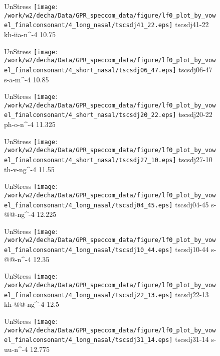 \documentclass{article}
\begin{document}
\begin{figure}[t]
\begin{minipage}[b]{.24\textwidth}
UnStress
\centering
\texttt{[image: /work/w2/decha/Data/GPR\_speccom\_data/figure/lf0\_plot\_by\_vowel\_finalconsonant/4\_long\_nasal/tscsdj41\_22.eps]}
tscsdj41-22 kh-iia-n\textasciicircum-4 10.75
\end{minipage}
\begin{minipage}[b]{.24\textwidth}
UnStress
\centering
\texttt{[image: /work/w2/decha/Data/GPR\_speccom\_data/figure/lf0\_plot\_by\_vowel\_finalconsonant/4\_short\_nasal/tscsdj06\_47.eps]}
tscsdj06-47 s-a-m\textasciicircum-4 10.85
\end{minipage}
\begin{minipage}[b]{.24\textwidth}
UnStress
\centering
\texttt{[image: /work/w2/decha/Data/GPR\_speccom\_data/figure/lf0\_plot\_by\_vowel\_finalconsonant/4\_short\_nasal/tscsdj20\_22.eps]}
tscsdj20-22 ph-o-n\textasciicircum-4 11.325
\end{minipage}
\begin{minipage}[b]{.24\textwidth}
UnStress
\centering
\texttt{[image: /work/w2/decha/Data/GPR\_speccom\_data/figure/lf0\_plot\_by\_vowel\_finalconsonant/4\_short\_nasal/tscsdj27\_10.eps]}
tscsdj27-10 th-v-ng\textasciicircum-4 11.55
\end{minipage}
\end{figure}
\clearpage
\begin{figure}[t]
\begin{minipage}[b]{.24\textwidth}
UnStress
\centering
\texttt{[image: /work/w2/decha/Data/GPR\_speccom\_data/figure/lf0\_plot\_by\_vowel\_finalconsonant/4\_long\_nasal/tscsdj04\_45.eps]}
tscsdj04-45 s-@@-ng\textasciicircum-4 12.225
\end{minipage}
\begin{minipage}[b]{.24\textwidth}
UnStress
\centering
\texttt{[image: /work/w2/decha/Data/GPR\_speccom\_data/figure/lf0\_plot\_by\_vowel\_finalconsonant/4\_long\_nasal/tscsdj10\_44.eps]}
tscsdj10-44 s-@@-n\textasciicircum-4 12.35
\end{minipage}
\begin{minipage}[b]{.24\textwidth}
UnStress
\centering
\texttt{[image: /work/w2/decha/Data/GPR\_speccom\_data/figure/lf0\_plot\_by\_vowel\_finalconsonant/4\_long\_nasal/tscsdj22\_13.eps]}
tscsdj22-13 kh-@@-ng\textasciicircum-4 12.5
\end{minipage}
\begin{minipage}[b]{.24\textwidth}
UnStress
\centering
\texttt{[image: /work/w2/decha/Data/GPR\_speccom\_data/figure/lf0\_plot\_by\_vowel\_finalconsonant/4\_long\_nasal/tscsdj31\_14.eps]}
tscsdj31-14 s-uu-n\textasciicircum-4 12.775
\end{minipage}
\end{figure}
\end{document}
